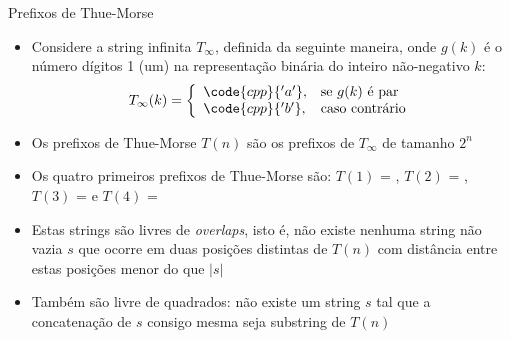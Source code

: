 \begin{frame}[fragile]{Prefixos de Thue-Morse}

    \begin{itemize}
        \item Considere a string infinita $T_\infty$, definida da seguinte maneira, onde $g(k)$ é 
            o número dígitos 1 (um) na representação binária do inteiro não-negativo $k$:
        \[
            T_\infty(k) = \left\lbrace \begin{array}{ll} \code{cpp}{'a'}, & \mbox{se}\ g(k)\ \mbox{é par} \\
            \code{cpp}{'b'},& \mbox{caso contrário} \end{array} \right.
        \]
        \pause

        \item Os prefixos de Thue-Morse $T(n)$ são os prefixos de $T_\infty$ de tamanho $2^n$
        \pause

        \item Os quatro primeiros prefixos de Thue-Morse são: $T(1)$ = , $T(2)$ = , $T(3)$ =  e 
            $T(4)$ =  
        \pause

        \item Estas strings são livres de \textit{overlaps}, isto é, não existe nenhuma string não 
            vazia $s$ que ocorre em duas posições distintas de $T(n)$ com distância entre estas 
            posições menor do que $|s|$
        \pause

        \item Também são livre de quadrados: não existe um string $s$ tal que a concatenação de 
            $s$ consigo mesma seja substring de $T(n)$
    \end{itemize}

\end{frame}


